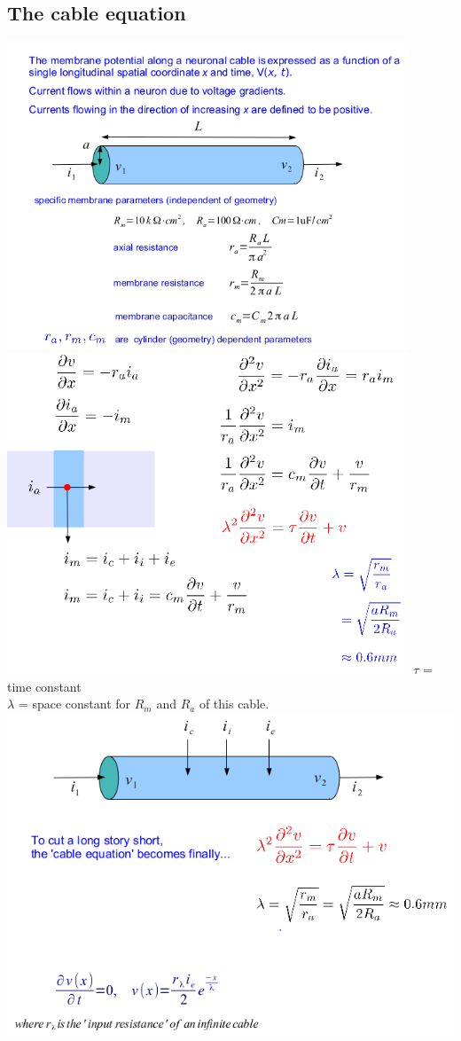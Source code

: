 \documentclass[english,11pt]{article}
\begin{document}
\subsection{The cable equation}
\includegraphics[width=0.9\textwidth]{cable-equation1.png}
\includegraphics[width=0.9\textwidth]{cable-equation2.png}
$\tau$ = time constant\\
$\lambda$ = space constant for $R_m$ and $R_a$ of this cable.\\
\includegraphics[width=\textwidth]{cable-equation3.png}
\end{document}
